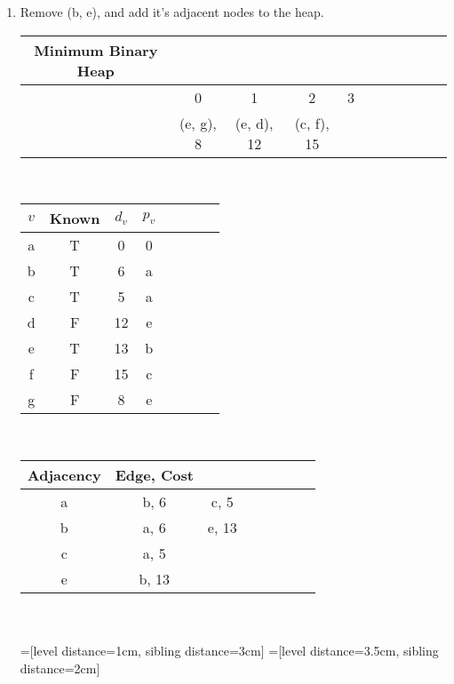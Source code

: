 \documentclass[11pt]{article}
\begin{document}
\begin{enumerate}
\begin{enumerate}
\item Remove (b, e), and add it's adjacent nodes to the heap.\\
\begin{tabular}{ccccccccccc}
Minimum Binary Heap\\\hline
&0&1&2&3\\
&(e, g), 8&(e, d), 12& (c, f), 15& \\
\end{tabular}\\
\begin{tabular}{c|ccccccc|}
$v$& Known& $d_v$ & $p_v$\\\hline
a&T & 0 & 0\\
b&T & 6 & a\\
c&T & 5 & a\\
d&F & 12 & e\\
e&T & 13 & b\\
f&F & 15 & c\\
g&F & 8 & e
\end{tabular}\\
\begin{tabular}{c|ccccccc|}
Adjacency& Edge, Cost\\\hline
a& b, 6 & c, 5\\
b&a, 6&e, 13\\
c&a, 5&\\
e&b, 13\\
\end{tabular}\\
\\
=[level distance=1cm, sibling distance=3cm]
=[level distance=3.5cm, sibling distance=2cm]


\end{enumerate}
\end{enumerate}
\end{document}

